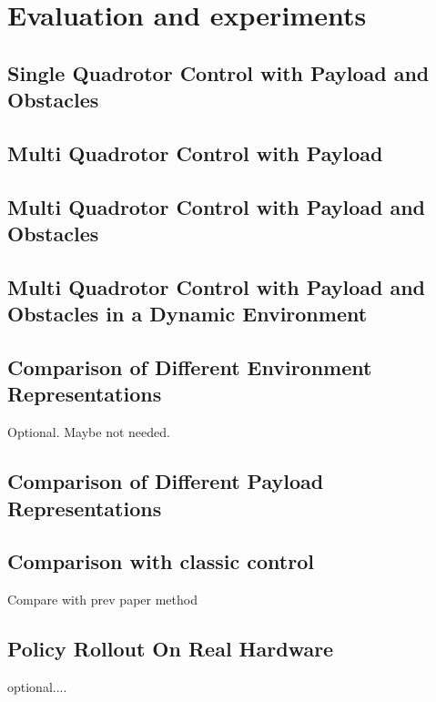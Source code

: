 \chapter{Evaluation and experiments}
\section{Single Quadrotor Control with Payload and Obstacles}
\section{Multi Quadrotor Control with Payload}
\section{Multi Quadrotor Control with Payload and Obstacles}
\section{Multi Quadrotor Control with Payload and Obstacles in a Dynamic Environment}
\section{Comparison of Different Environment Representations}
Optional. Maybe not needed.
\section{Comparison of Different Payload Representations}
\section{Comparison with classic control}
Compare with prev paper method \autocite{Wahba2024}
\section{Policy Rollout On Real Hardware}
optional....
